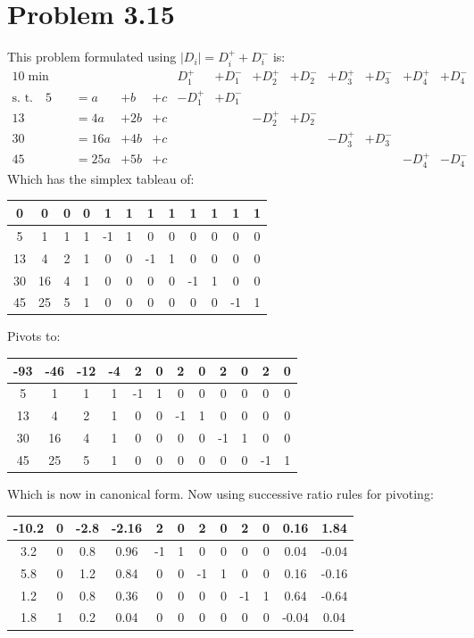 \documentclass[a4paper,12pt]{article}
\begin{document}
\section*{Problem 3.15}
This problem formulated using \(|D_i| = D_i^+ + D_i^-\) is:
\begin{alignat*}{10}
  \min \quad {}& {}& {}& {}& D_1^+& + D_1^-& + D_2^+& + D_2^-& + D_3^+& + D_3^-& + D_4^+& + D_4^-& \\
  \text{s. t.} \quad 5& = a& + b& +c& -D_1^+& + D_1^-& {}& {}& {}& {}& {}& {}& \\ 
  13& = 4a& + 2b& + c& {}& {}& - D_2^+& + D_2^-& {}& {}& {}& {}&\\
  30& = 16a& + 4b& + c& {}& {}& {}& {}& - D_3^+& + D_3^-& {}& {}&\\
  45& = 25a& + 5b& + c& {}& {}& {}& {}& {}& {}& - D_4^+& - D_4^-&
\end{alignat*}
Which has the simplex tableau of:
\begin{center}
\begin{tabular}{| c | c  c  c  c  c  c  c  c  c  c  c |}
\hline
0 & 0 & 0 & 0 & 1 & 1 & 1 & 1 & 1 & 1 & 1 & 1\\
\hline
5 & 1 & 1 & 1 & -1 & 1 & 0 & 0 & 0 & 0 & 0 & 0\\
13 & 4 & 2 & 1 & 0 & 0 & -1 & 1 & 0 & 0 & 0 & 0\\
30 & 16 & 4 & 1 & 0 & 0 & 0 & 0 & -1 & 1 & 0 & 0\\
45 & 25 & 5 & 1 & 0 & 0 & 0 & 0 & 0 & 0 & -1 & 1\\
\hline
\end{tabular}
\end{center}
Pivots to:
\begin{center}
\begin{tabular}{| c | c  c  c  c  c  c  c  c  c  c  c |}
\hline
-93 & -46 & -12 & -4 & 2 & 0 & 2 & 0 & 2 & 0 & 2 & 0\\
\hline
5 & 1 & 1 & 1 & -1 & 1 & 0 & 0 & 0 & 0 & 0 & 0\\
13 & 4 & 2 & 1 & 0 & 0 & -1 & 1 & 0 & 0 & 0 & 0\\
30 & 16 & 4 & 1 & 0 & 0 & 0 & 0 & -1 & 1 & 0 & 0\\
45 & 25 & 5 & 1 & 0 & 0 & 0 & 0 & 0 & 0 & -1 & 1\\
\hline
\end{tabular}
\end{center}
Which is now in canonical form. Now using successive ratio rules for pivoting:
\begin{center}
\begin{tabular}{| c | c  c  c  c  c  c  c  c  c  c  c |}
\hline
-10.2 & 0 & -2.8 & -2.16 & 2 & 0 & 2 & 0 & 2 & 0 & 0.16 & 1.84\\
\hline
3.2 & 0 & 0.8 & 0.96 & -1 & 1 & 0 & 0 & 0 & 0 & 0.04 & -0.04\\
5.8 & 0 & 1.2 & 0.84 & 0 & 0 & -1 & 1 & 0 & 0 & 0.16 & -0.16\\
1.2 & 0 & 0.8 & 0.36 & 0 & 0 & 0 & 0 & -1 & 1 & 0.64 & -0.64\\
1.8 & 1 & 0.2 & 0.04 & 0 & 0 & 0 & 0 & 0 & 0 & -0.04 & 0.04\\
\hline
\end{tabular}
\end{center}
\end{document}

